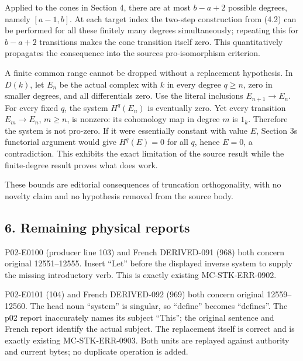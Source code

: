 Applied to the cones in Section 4,\allowbreak{} there are at most \(b-a+2\) possible degrees,\allowbreak{} namely \([a-1,b]\). At each target index the two-step construction from (4.2)\allowbreak{} can be performed for all these finitely many degrees simultaneously; repeating this for \(b-a+2\) transitions makes the cone transition itself zero. This quantitatively propagates the consequence into the source\textquotesingle s pro-isomorphism criterion.

A finite common range cannot be dropped without a replacement hypothesis. In \(D(k)\),\allowbreak{} let \(E_n\) be the actual complex with \(k\) in every degree \(q\geq n\),\allowbreak{} zero in smaller degrees,\allowbreak{} and all differentials zero. Use the literal inclusions \(E_{n+1}\to E_n\). For every fixed \(q\),\allowbreak{} the system \(H^q(E_n)\) is eventually zero. Yet every transition \(E_m\to E_n\),\allowbreak{} \(m\geq n\),\allowbreak{} is nonzero:\allowbreak{} its cohomology map in degree \(m\) is \(1_k\). Therefore the system is not pro-zero. If it were essentially constant with value \(E\),\allowbreak{} Section 3\textquotesingle s functorial argument would give \(H^q(E)=0\) for all \(q\),\allowbreak{} hence \(E=0\),\allowbreak{} a contradiction. This exhibits the exact limitation of the source result while the finite-degree result proves what does work.

These bounds are editorial consequences of truncation orthogonality,\allowbreak{} with no novelty claim and no hypothesis removed from the source body.

\subsection{6. Remaining physical reports}\label{proofs-12380-12604-remaining-physical-reports}

P02-E0100 (producer line 103)\allowbreak{} and French DERIVED-091 (968)\allowbreak{} both concern original 12551–\allowbreak{}12555. Insert ``Let'' before the displayed inverse system to supply the missing introductory verb. This is exactly existing MC-STK-ERR-0902.

P02-E0101 (104)\allowbreak{} and French DERIVED-092 (969)\allowbreak{} both concern original 12559–\allowbreak{}12560. The head noun ``system'' is singular,\allowbreak{} so ``define'' becomes ``defines''. The p02 report inaccurately names its subject ``This''; the original sentence and French report identify the actual subject. The replacement itself is correct and is exactly existing MC-STK-ERR-0903. Both units are replayed against authority and current bytes; no duplicate operation is added.

